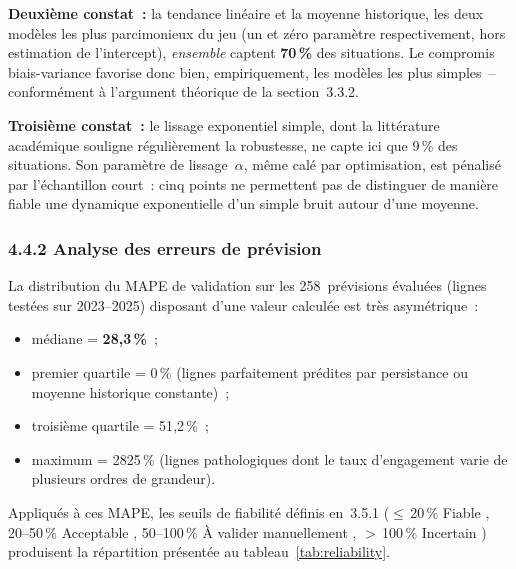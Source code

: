 \textbf{Deuxi\`eme constat~:} la tendance lin\'eaire et la moyenne historique,
les deux mod\`eles les plus parcimonieux du jeu (un et z\'ero param\`etre
respectivement, hors estimation de l'intercept), \emph{ensemble} captent
\textbf{70\,\%} des situations. Le compromis biais-variance favorise donc bien,
empiriquement, les mod\`eles les plus simples~-- conform\'ement \`a l'argument
th\'eorique de la section~3.3.2.

\textbf{Troisi\`eme constat~:} le lissage exponentiel simple, dont la
litt\'erature acad\'emique souligne r\'eguli\`erement la robustesse, ne capte
ici que 9\,\% des situations. Son param\`etre de lissage~$\alpha$,
m\^eme cal\'e par optimisation, est p\'enalis\'e par l'\'echantillon
court~: cinq points ne permettent pas de distinguer de mani\`ere fiable une
dynamique exponentielle d'un simple bruit autour d'une moyenne.

\subsubsection*{4.4.2 \quad Analyse des erreurs de pr\'evision}

La distribution du MAPE de validation sur les 258~pr\'evisions \'evalu\'ees (lignes test\'ees sur 2023--2025)
disposant d'une valeur calcul\'ee est tr\`es asym\'etrique~:

\begin{itemize}
    \item m\'ediane = \textbf{28{,}3\,\%}~;
    \item premier quartile = 0\,\% (lignes parfaitement pr\'edites par
    persistance ou moyenne historique constante)~;
    \item troisi\`eme quartile = 51{,}2\,\%~;
    \item maximum = 2825\,\% (lignes \og pathologiques \fg{} dont le taux
    d'engagement varie de plusieurs ordres de grandeur).
\end{itemize}

Appliqu\'es \`a ces MAPE, les seuils de fiabilit\'e d\'efinis en~3.5.1
($\leq$\,20\,\% \og Fiable \fg{}, 20--50\,\% \og Acceptable \fg{}, 50--100\,\%
\og \`A valider manuellement \fg{}, $>$\,100\,\% \og Incertain \fg{}) produisent
la r\'epartition pr\'esent\'ee au tableau~\ref{tab:reliability}.

